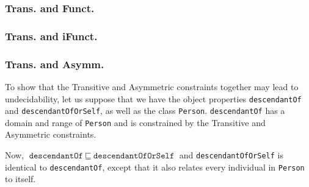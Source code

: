 \documentclass{article}
\def\code#1{\texttt{#1}}
\begin{document}
  \subsubsection{Trans. and Funct.}





  \subsubsection{Trans. and iFunct.}

  

  \subsubsection{Trans. and Asymm.}

  To show that the Transitive and Asymmetric constraints together may lead to undecidability, let us suppose that we have the object properties \code{descendantOf} and \code{descendantOfOrSelf}, as well as the class \code{Person}.
  \code{descendantOf} has a domain and range of \code{Person} and is constrained by the Transitive and Asymmetric constraints.
  
  Now, $\code{descendantOf}~\sqsubseteq~\code{descendantOfOrSelf}$ and \code{descendantOfOrSelf} is identical to \code{descendantOf}, except that it also relates every individual in \code{Person} to itself.
\end{document}
